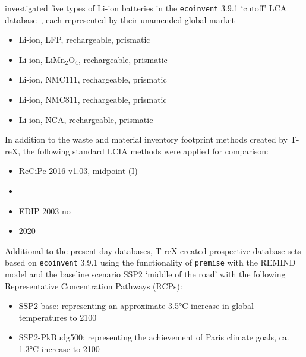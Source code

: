 \documentclass[a4paper,fleqn]{cas-dc}
\begin{document}
\protect{}
\protect{} investigated five types of Li-ion batteries in the
\texttt{ecoinvent} 3.9.1 `cutoff' LCA database~\citep{ecoinvent2016version3},
each represented by their unamended global market \protect{} \protect{}\begin{itemize}
	\item Li-ion, LFP, rechargeable, prismatic
	\item Li-ion, LiMn\(_2\)O\(_4\), rechargeable, prismatic
	\item Li-ion, NMC111, rechargeable, prismatic
	\item Li-ion, NMC811, rechargeable, prismatic
	\item Li-ion, NCA, rechargeable, prismatic
\end{itemize}

In addition to the waste and material inventory footprint methods created by
T-reX, the following standard LCIA methods were applied for comparison:

\protect\TLSdel{[itemsep=0pt]}
\begin{itemize}
	\item ReCiPe 2016 v1.03, midpoint (I)~\citep{huijbregts2016recipe}
	\item \protect{} \protect{}\citep{eu2023ef}
	\item \protect{} EDIP 2003 no \protect{} \protect{}\citep{hauschild2003edip}
	\item \protect{} \protect{} 2020~\citep{arvidsson2020csi}
\end{itemize}

Additional to the present-day databases, T-reX created prospective database
sets based on \texttt{ecoinvent} 3.9.1 using the functionality of
\texttt{premise} with the REMIND model and the baseline scenario SSP2 `middle
of the road' with the following Representative Concentration Pathways (RCPs):
\begin{itemize}
	\item SSP2-base: representing an approximate 3.5°C increase in global temperatures to
	      2100
	\item SSP2-PkBudg500: representing the achievement of Paris climate goals, ca. 1.3°C
	      increase to 2100
\end{itemize}
\end{document}
